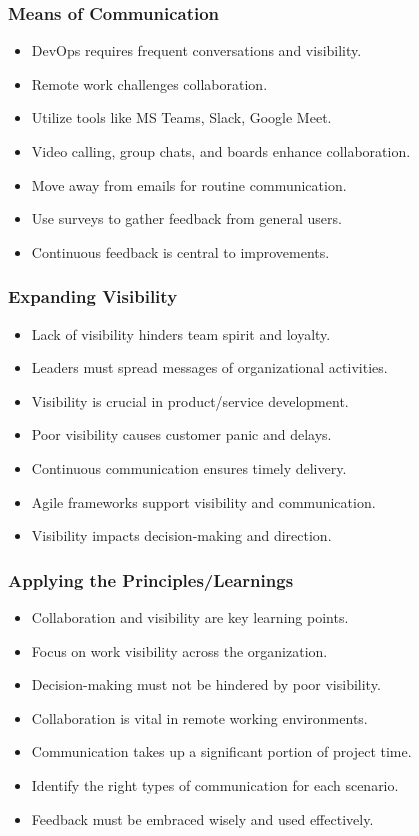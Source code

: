 \documentclass[aspectratio=169, table]{beamer}
\begin{document}
\begin{frame}
\frametitle{Means of Communication}

\begin{itemize}
	\item DevOps requires frequent conversations and visibility.
	\item Remote work challenges collaboration.
	\item Utilize tools like MS Teams, Slack, Google Meet.
	\item Video calling, group chats, and boards enhance collaboration.
	\item Move away from emails for routine communication.
	\item Use surveys to gather feedback from general users.
	\item Continuous feedback is central to improvements.
\end{itemize}
\end{frame}

\begin{frame}
\frametitle{Expanding Visibility}

\begin{itemize}
	\item Lack of visibility hinders team spirit and loyalty.
	\item Leaders must spread messages of organizational activities.
	\item Visibility is crucial in product/service development.
	\item Poor visibility causes customer panic and delays.
	\item Continuous communication ensures timely delivery.
	\item Agile frameworks support visibility and communication.
	\item Visibility impacts decision-making and direction.
\end{itemize}
\end{frame}

\begin{frame}
\frametitle{Applying the Principles/Learnings}

\begin{itemize}
	\item Collaboration and visibility are key learning points.
	\item Focus on work visibility across the organization.
	\item Decision-making must not be hindered by poor visibility.
	\item Collaboration is vital in remote working environments.
	\item Communication takes up a significant portion of project time.
	\item Identify the right types of communication for each scenario.
	\item Feedback must be embraced wisely and used effectively.
\end{itemize}
\end{frame}
\end{document}
